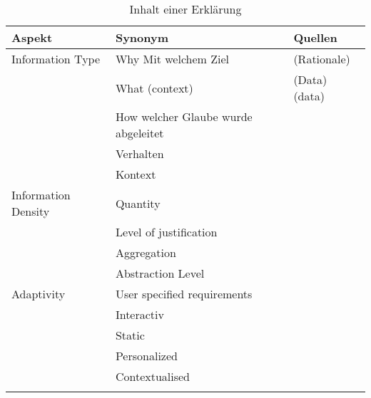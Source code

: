 \begin{longtable}{|p{}|p{}|p{}|}
    \hline
    \textbf{Aspekt}     & \textbf{Synonym} & \textbf{Quellen} \\ \hline
    Information Type    & Why Mit welchem Ziel & \cite{chazette2020explainability} \cite{abdulrahman_belief-based_2019} \cite{yamada_evaluating_2016} \cite{sato_action-triggering_2019} \cite{zahedi_towards_2019} \cite{zahedi_towards_2019} \cite{zolotas_towards_2019} \cite{cassens_ambient_2019} \cite{thomson_knowledge--information_2020} \cite{chari_explanation_2020} \cite{neerincx_using_2018} \cite{nunes_systematic_2017} (Rationale) \cite{zhu_effects_2020} \cite{ribera2019can} \cite{lim_2009_assessing} \\
                        & What (context) & \cite{chazette2020explainability} \cite{zahedi_towards_2019} \cite{cassens_ambient_2019} \cite{zahedi_towards_2019} \cite{zolotas_towards_2019} \cite{chari_explanation_2020} \cite{nunes_systematic_2017} (Data) \cite{ribera2019can} (data) \\
                        & How welcher Glaube wurde abgeleitet & \cite{chazette2020explainability} \cite{sato_action-triggering_2019} \cite{thomson_knowledge--information_2020} \cite{chari_explanation_2020} \cite{neerincx_using_2018} \cite{lim_2009_assessing} \\
                        & Verhalten & \cite{zhu_effects_2020} \cite{ribera2019can}\\
                        & Kontext &  \\
    \hline
    Information Density & Quantity & \cite{ribera2019can} \cite{kouki_user_2017} \\
                        & Level of justification & \cite{hernandez-bocanegra_effects_2020} \\
                        & Aggregation & \cite{hernandez-bocanegra_effects_2020} \cite{martin_developing_2019} \\
                        & Abstraction Level & \cite{thomson_knowledge--information_2020} \\
    \hline
    Adaptivity          & User specified requirements & \cite{tintarev_designing_nodate} \\
                        & Interactiv  & \cite{abdulrahman_belief-based_2019} \cite{cheng2019explaining} \\
                        & Static & \cite{abdulrahman_belief-based_2019} \\
                        & Personalized & \cite{kaptein_personalised_2017} \cite{cassens_ambient_2019}  \cite{sokol_one_2020} \\
                        & Contextualised & \cite{kaptein_personalised_2017} \cite{cassens_ambient_2019} \\
    \hline
\caption{Inhalt einer Erklärung}
\label{tab:content_of_explanations}
\end{longtable}

